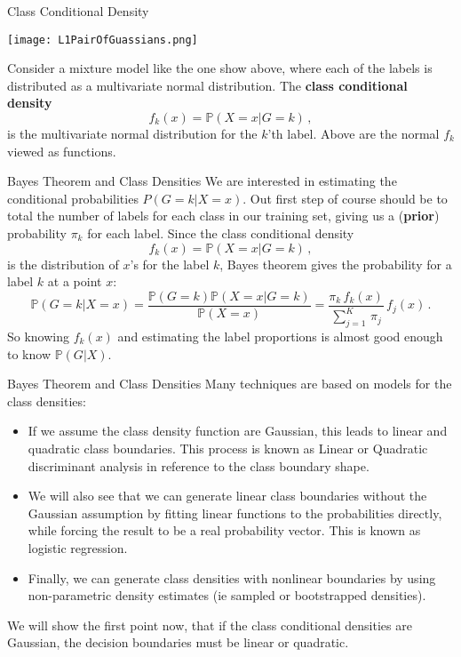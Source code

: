 \documentclass[10pt, table, dvipsnames,xcdraw, handout]{beamer}
\newcommand{\bP}{\ensuremath{\mathbb{P}}}
\begin{document}
\begin{frame}[fragile]{Class Conditional Density}
  \begin{minipage}[t][0.5\textheight][t]{\textwidth}
	\centering \texttt{[image: L1PairOfGuassians.png]} 
  \end{minipage}
  \vfill
\begin{minipage}[t][0.5\textheight][t]{\textwidth}
Consider a mixture model like the one show above, where each of the labels is distributed as a multivariate normal distribution. The \textbf{class conditional density} 
$$
f_k(x) = \bP(X=x|G=k)\,,
$$
is the multivariate normal distribution for the $k$'th label. Above are the normal $f_k$ viewed as functions. 
\end{minipage}
\end{frame}



\begin{frame}[fragile]{Bayes Theorem and Class Densities}
We  are interested in estimating the conditional probabilities $P(G = k|X = x)$. Out first step of course should be to total the number of labels for each class in our training set, giving us a (\textbf{prior}) probability $\pi_k$ for each label. \pause Since the class conditional density
$$
f_k(x) = \bP(X=x|G=k)\,,
$$
is the distribution of $x$'s for the label $k$, Bayes theorem gives the probability for a label $k$ at a point $x$:
$$
\bP(G=k|X=x) = \frac{\bP(G=k) \bP(X=x|G=k)}{\bP(X=x)} = \frac{ \pi_k \, f_k(x)}{\sum_{j=1}^K\,\pi_j}\, f_j(x)\,.
$$\pause
So knowing $f_k(x)$ and estimating the label proportions is almost good enough to know $\bP(G|X)$. 
\end{frame}







\begin{frame}[fragile]{Bayes Theorem and Class Densities}
Many techniques are based on models for the class densities:
\begin{itemize}
\item[] If we assume the class density function are Gaussian, this leads to linear and quadratic class boundaries. This process is known as Linear or Quadratic discriminant analysis in reference to the class boundary shape. \pause
\item[] We will also see that we can generate linear class boundaries without the Gaussian assumption by fitting linear functions to the probabilities directly, while forcing the result to be a real probability vector. This is known as logistic regression. 
\pause
\item[] Finally, we can generate class densities with nonlinear boundaries by using non-parametric density estimates (ie sampled or bootstrapped densities).\pause
\end{itemize}

We will show the first point now, that if the class conditional densities are Gaussian, the decision boundaries must be linear or quadratic.
\end{frame}
\end{document}
